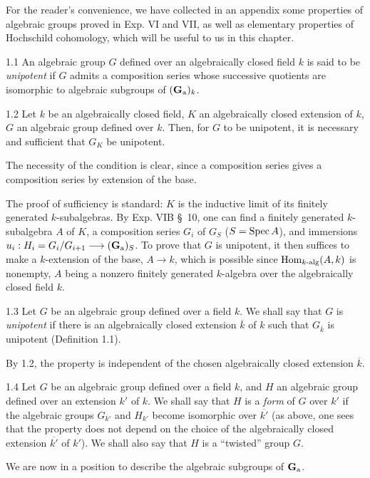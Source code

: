 For the reader's convenience, we have collected in an appendix some properties of algebraic groups proved in Exp. VI and VII, as well as elementary properties of Hochschild cohomology, which will be useful to us in this chapter.

\begin{definition}{1.1}\label{XVII.1.1}
An algebraic group $G$ defined over an algebraically closed field $k$ is said to be \emph{unipotent} if $G$ admits a composition series whose successive quotients are isomorphic to algebraic subgroups of $(\mathbf{G}_{\mathrm{a}})_k$.
\end{definition}

\begin{proposition}{1.2}\label{XVII.1.2}
Let $k$ be an algebraically closed field, $K$ an algebraically closed extension of $k$, $G$ an algebraic group defined over $k$. Then, for $G$ to be unipotent, it is necessary and sufficient that $G_K$ be unipotent.
\end{proposition}
The necessity of the condition is clear, since a composition series gives a composition series by extension of the base.

The proof of sufficiency is standard: $K$ is the inductive limit of its finitely generated $k$-subalgebras. By Exp. VIB \S~10, one can find a finitely generated $k$-subalgebra $A$ of $K$, a composition series $G_i$ of $G_S$ ($S=\operatorname{Spec} A$), and immersions $u_i:H_i=G_i/G_{i+1}\longrightarrow(\mathbf{G}_{\mathrm{a}})_S$. To prove that $G$ is unipotent, it then suffices to make a $k$-extension of the base, $A\to k$, which is possible since $\operatorname{Hom}_{k\text{-alg}}(A,k)$ is nonempty, $A$ being a nonzero finitely generated $k$-algebra over the algebraically closed field $k$.

\begin{definition}{1.3}\label{XVII.1.3}
Let $G$ be an algebraic group defined over a field $k$. We shall say that $G$ is \emph{unipotent} if there is an algebraically closed extension $\overline k$ of $k$ such that $G_{\overline k}$ is unipotent (Definition 1.1).
\end{definition}
By 1.2, the property is independent of the chosen algebraically closed extension $\overline k$.

\begin{definition}{1.4}\label{XVII.1.4}
Let $G$ be an algebraic group defined over a field $k$, and $H$ an algebraic group defined over an extension $k'$ of $k$. We shall say that $H$ is a \emph{form} of $G$ over $k'$ if the algebraic groups $G_{k'}$ and $H_{k'}$ become isomorphic over $\overline{k'}$ (as above, one sees that the property does not depend on the choice of the algebraically closed extension $\overline{k'}$ of $k'$). We shall also say that $H$ is a ``twisted'' group $G$.
\end{definition}
We are now in a position to describe the algebraic subgroups of $\mathbf{G}_{\mathrm{a}}$.

